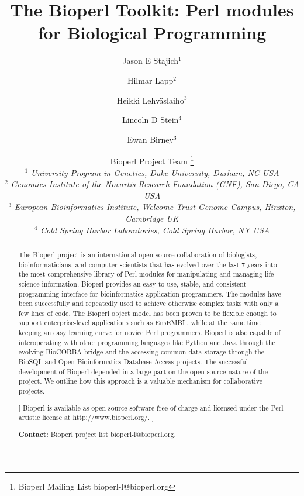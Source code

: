 \documentclass[12pt]{article}
\begin{document}
\doublespacing

\title{The Bioperl Toolkit: Perl modules for Biological Programming}
\author{Jason E Stajich$^1$ \and
Hilmar Lapp$^2$ \and
Heikki Lehv\"{a}slaiho$^3$ \and 
Lincoln D Stein$^4$ \and Ewan Birney$^3$ \and
Bioperl Project Team \thanks{Bioperl Mailing List bioperl-l@bioperl.org} \\
$^1$ \small{\textit{University Program in Genetics, Duke University,  Durham, NC USA}} \\
$^2$ \small{\textit{Genomics Institute of the Novartis Research
Foundation (GNF), San Diego, CA USA}} \\
$^3$ \small{\textit{European Bioinformatics Institute, Welcome Trust
Genome Campus, Hinxton, Cambridge UK}} \\
$^4$ \small{\textit{Cold Spring Harbor Laboratories, Cold Spring Harbor, NY USA }}\\
}
\maketitle
\begin{abstract}

The Bioperl project is an international open source collaboration of
biologists, bioinformaticians, and computer scientists that has
evolved over the last 7 years into the most comprehensive library of
Perl modules for manipulating and managing life science information.
Bioperl provides an easy-to-use, stable, and consistent programming
interface for bioinformatics application programmers.  The modules
have been successfully and repeatedly used to achieve otherwise
complex tasks with only a few lines of code.  The Bioperl object model
has been proven to be flexible enough to support enterprise-level
applications such as EnsEMBL, while at the same time keeping an easy
learning curve for novice Perl programmers.  Bioperl is also capable
of interoperating with other programming languages like Python and
Java through the evolving BioCORBA bridge and the accessing common
data storage through the BioSQL and Open Bioinformatics Database
Access projects.  The successful development of Bioperl depended in a
large part on the open source nature of the project.  We outline how
this approach is a valuable mechanism for collaborative projects.

[ Bioperl is available as open source software free of charge and
licensed under the Perl artistic license at \url{http://www.bioperl.org/}. ]

\textbf{Contact:} Bioperl project list \url{bioperl-l@bioperl.org}.

\end{abstract}
\end{document}
